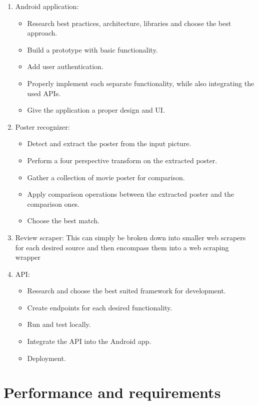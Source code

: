 \documentclass[12pt,a4paper,twoside]{report}
\begin{document}
\begin{enumerate}
    \item Android application:
    \begin{itemize}
        \item Research best practices, architecture, libraries and choose the best approach.
        \item Build a prototype with basic functionality.
        \item Add user authentication.
        \item Properly implement each separate functionality, while also integrating the used APIs.
        \item Give the application a proper design and UI.
    \end{itemize}
    \item Poster recognizer:
    \begin{itemize}
        \item Detect and extract the poster from the input picture.
        \item Perform a four perspective transform on the extracted poster.
        \item Gather a collection of movie poster for comparison.
        \item Apply comparison operations between the extracted poster and the comparison ones.
        \item Choose the best match.
    \end{itemize}
    \item Review scraper: This can simply be broken down into smaller web scrapers for each desired source and then encompass them into a web scraping wrapper
    \item API:
    \begin{itemize}
        \item Research and choose the best suited framework for development.
        \item Create endpoints for each desired functionality.
        \item Run and test locally.
        \item Integrate the API into the Android app.
        \item Deployment.
    \end{itemize}
\end{enumerate}

\section{Performance and requirements}
\end{document}
